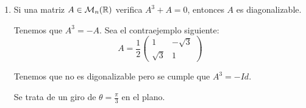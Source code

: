 \documentclass[12pt]{article}
\begin{document}
\begin{ejercicio} [4 ptos]
\begin{enumerate}
        Por tanto, tenemos que la multiplicidad algebraica del $1$ es $3$, pero su multiplicidad geométrica es $2$. Por tanto, tenemos que no es diagonalizable.

        El enunciado, por tanto, es falso.
        
        

        \item Si una matriz $A\in \mathcal{M}_n(\mathbb{R})$ verifica $A^3+A=0$, entonces $A$ es diagonalizable.

        Tenemos que $A^3=-A$. Sea el contraejemplo siguiente:
        \begin{equation*}
            A=\frac{1}{2}\left(\begin{array}{cc}
                1 & -\sqrt{3} \\
                \sqrt{3} & 1
            \end{array}\right)
        \end{equation*}

        Tenemos que no es digonalizable pero se cumple que $A^3=-Id$.

        \begin{observacion}
            Se trata de un giro de $\theta = \frac{\pi}{3}$ en el plano.
        \end{observacion}
    \end{enumerate}
\end{ejercicio}
\end{document}
